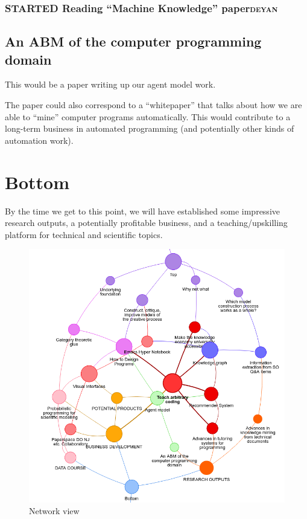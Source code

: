 \documentclass[11pt]{article}
\begin{document}
\subsubsection{{\bfseries\sffamily STARTED} Reading ``Machine Knowledge'' paper\hfill{}\textsc{deyan}}
\label{sec:org9a763d9}
\subsection{An ABM of the computer programming domain}
\label{sec:org78dea13}
This would be a paper writing up our agent model work.

The paper could also correspond to a “whitepaper” that talks about how
we are able to “mine” computer programs automatically.  This would
contribute to a long-term business in automated programming (and
potentially other kinds of automation work).
\section{Bottom}
\label{sec:orgb0a31c2}
By the time we get to this point, we will have established some
impressive research outputs, a potentially profitable business, and a
teaching/upskilling platform for technical and scientific topics.

\begin{figure}[htbp]
\centering
\includegraphics[width=\textwidth]{org-roam-server-3oct2020.png}
\caption{Network view}
\end{figure}
\end{document}
